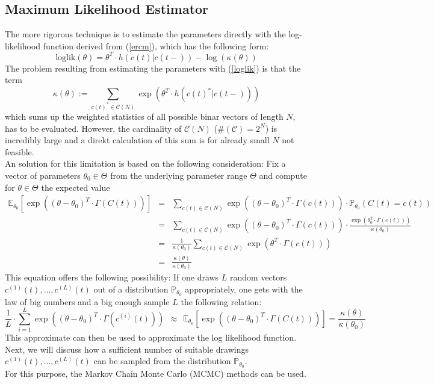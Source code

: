 \documentclass[headsepline=true, abstracton]{scrartcl}
\begin{document}
\subsection*{Maximum Likelihood Estimator}
The more rigorous technique is to estimate the parameters directly with the log-likelihood function derived from (\ref{ercm}), which has the following form:
%
\begin{equation}
\text{loglik}(\theta)=\theta^T \cdot h(c(t)| c(t-))-\log(\kappa(\theta))
\label{loglik}
\end{equation}
%
The problem resulting from estimating the parameters with (\ref{loglik}) is that the term
%
$$\kappa(\theta):= \sum_{c(t)^* \in \mathcal{C}(N)} \exp(\theta^T \cdot h(c(t)^*|c(t-)))$$ 
%
which sums up the weighted statistics of all possible binar vectors of length $N$, has to be evaluated. However, the cardinality of $\mathcal{C}(N)$ (\#$(\mathcal{C})=2^N$) is incredibly large and a direkt calculation of this sum is for already small $N$ not feasible. \\[0.3cm]
An solution for this limitation is based on the following consideration: Fix a vector of parameters $\theta_0 \in \Theta$ from the underlying parameter range $\Theta$ and compute for $\theta \in \Theta$ the expected value
%
\begin{eqnarray*}
\mathbb{E}_{\theta_0}\left[ \exp\left((\theta - \theta_0)^T \cdot \Gamma(C(t))\right) \right]&=& 
\sum_{c(t) \in \mathcal{C}(N)}\exp\left((\theta - \theta_0)^T \cdot \Gamma(c(t))\right)\cdot \mathbb{P}_{\theta_0}(C(t)=c(t))\\
&=& \sum_{c(t) \in \mathcal{C}(N)}\exp\left((\theta - \theta_0)^T \cdot \Gamma(c(t))\right)\cdot 
\frac{\exp(\theta_0^T \cdot \Gamma(c(t)))}{\kappa(\theta_0)}\\
&=& \frac{1}{\kappa(\theta_0)} \sum_{c(t) \in \mathcal{C}(N)}\exp\left(\theta^T \cdot \Gamma(c(t))\right)\\
&=&\frac{\kappa(\theta)}{\kappa(\theta_0)}
\end{eqnarray*}
%
This equation offers the following possibility: If one draws $L$ random vectors $c^{(1)}(t), \dots ,c^{(L)}(t)$ out of a distribution $\mathbb{P}_{\theta_0}$ appropriately, one gets with the law of big numbers and a big enough sample $L$ the following relation:
%
\begin{equation}
\frac{1}{L}\cdot \sum_{i=1}^{L}  \exp\left((\theta - \theta_0)^T \cdot \Gamma(c^{(i)}(t))\right)
~~\approx~~ \mathbb{E}_{\theta_0}\left[ \exp\left((\theta - \theta_0)^T \cdot \Gamma(C(t))\right) \right] = \frac{\kappa(\theta)}{\kappa(\theta_0)}
\label{konver}
\end{equation}
%
This approximate can then be used to approximate the log likelihood function.\\[0.4cm]
Next, we will discuss how a sufficient number of suitable drawings $c^{(1)}(t), \dots ,c^{(L)}(t)$ can be sampled from the distribution $\mathbb{P}_{\theta_0}$. \\
For this purpose, the Markov Chain Monte Carlo (MCMC) methods can be used.
\end{document}
